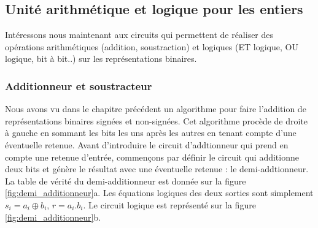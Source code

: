 \subsection{Unité arithmétique et logique pour les entiers}

Intéressons nous maintenant aux circuits qui permettent de réaliser des opérations arithmétiques (addition, soustraction) et logiques (ET logique, OU logique, bit à bit..) sur les représentations binaires. 

\subsubsection{Additionneur et soustracteur}

Nous avons vu dans le chapitre précédent un algorithme pour faire l'addition de représentations binaires signées et non-signées. Cet algorithme procède de droite à gauche en sommant les bits les uns après les autres en tenant compte d'une éventuelle retenue. Avant d'introduire le circuit d'addtionneur qui prend en compte une retenue d'entrée, commençons par définir le circuit qui additionne deux bits et génère le résultat avec une éventuelle retenue : le demi-addtionneur. La table de vérité du demi-additionneur est donnée sur la figure \ref{fig:demi_additionneur}a. Les équations logiques des deux sorties sont simplement $s_i = a_i \oplus b_i$, $r = a_i . b_i$. Le circuit logique est représenté sur la figure \ref{fig:demi_additionneur}b.

